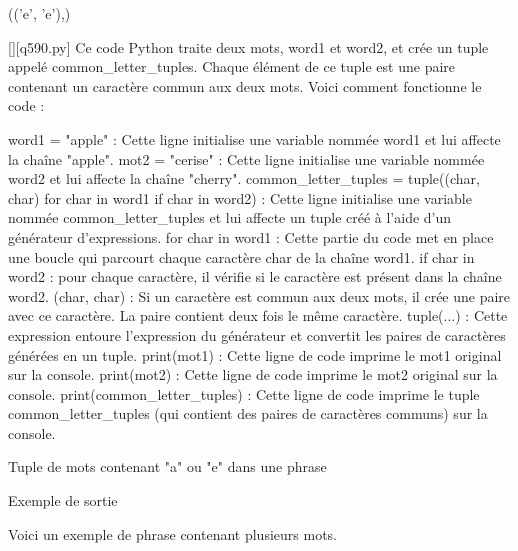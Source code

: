 (('e', 'e'),)
        \par
        \begin{solution}
            \renewcommand{\nomfichier}{q590.py}
            \pythonfile{\chemincode \nomfichier}[][\nomfichier]
            Ce code Python traite deux mots, word1 et word2, et crée un tuple appelé common_letter_tuples. Chaque élément de ce tuple est une paire contenant un caractère commun aux deux mots. Voici comment fonctionne le code :

    word1 = "apple" : Cette ligne initialise une variable nommée word1 et lui affecte la chaîne "apple".
    mot2 = "cerise" : Cette ligne initialise une variable nommée word2 et lui affecte la chaîne "cherry".
    common_letter_tuples = tuple((char, char) for char in word1 if char in word2) : Cette ligne initialise une variable nommée common_letter_tuples et lui affecte un tuple créé à l'aide d'un générateur d'expressions.
        for char in word1 : Cette partie du code met en place une boucle qui parcourt chaque caractère char de la chaîne word1.
        if char in word2 : pour chaque caractère, il vérifie si le caractère est présent dans la chaîne word2.
        (char, char) : Si un caractère est commun aux deux mots, il crée une paire avec ce caractère. La paire contient deux fois le même caractère.
        tuple(...) : Cette expression entoure l'expression du générateur et convertit les paires de caractères générées en un tuple.
    print(mot1) : Cette ligne de code imprime le mot1 original sur la console.
    print(mot2) : Cette ligne de code imprime le mot2 original sur la console.
    print(common_letter_tuples) : Cette ligne de code imprime le tuple common_letter_tuples (qui contient des paires de caractères communs) sur la console.
        \end{solution}
        

        \question
        Tuple de mots contenant "a" ou "e" dans une phrase

Exemple de sortie

Voici un exemple de phrase contenant plusieurs mots.

